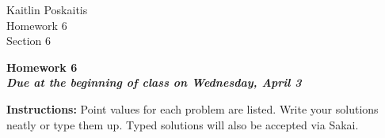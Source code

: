 \documentclass[11pt]{article}
\begin{document}
\sloppy

\noindent Kaitlin Poskaitis\\
Homework 6\\
Section 6\\

\begin{center}
\LARGE{\textbf{Homework 6}}\\
\large{\textbf{\emph{Due at the beginning of class on Wednesday, April 3}}}
\end{center}

\vspace{.1in}

\noindent\textbf{Instructions:} Point values for each problem are listed.
Write your solutions neatly or type them up.  Typed solutions will also be
accepted via Sakai.
\end{document}
